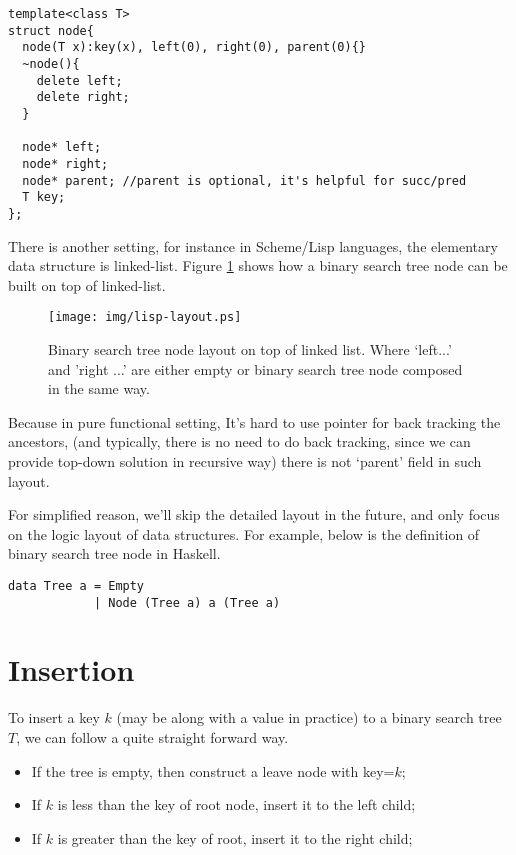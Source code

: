 \documentclass{article}
\begin{document}
\lstset{language=C++}
\begin{lstlisting}
template<class T>
struct node{
  node(T x):key(x), left(0), right(0), parent(0){}
  ~node(){ 
    delete left;
    delete right;
  }

  node* left; 
  node* right;
  node* parent; //parent is optional, it's helpful for succ/pred
  T key;
};
\end{lstlisting}

There is another setting, for instance in Scheme/Lisp languages, the elementary
data structure is linked-list. Figure \ref{fig:lisp-layout} shows how a binary
search tree node can be built on top of linked-list.

\begin{figure}[htbp]
       \begin{center}
        \texttt{[image: img/lisp-layout.ps]}
        \caption{Binary search tree node layout on top of linked list. Where `left...' and 'right ...' are either empty or binary search tree node composed in the same way.} \label{fig:lisp-layout}
       \end{center}
\end{figure}

Because in pure functional setting, It's hard to use pointer for back tracking
the ancestors, (and typically, there is no need to do back tracking, since
we can provide top-down solution in recursive way) there is not `parent' field
in such layout.

For simplified reason, we'll skip the detailed layout in the future, and only 
focus on the logic layout of data structures. For example, below is the definition
of binary search tree node in Haskell.

\lstset{language=Haskell}
\begin{lstlisting}
data Tree a = Empty 
            | Node (Tree a) a (Tree a)
\end{lstlisting}

\section{Insertion}

To insert a key $k$ (may be along with a value in practice) to a binary search tree $T$, we can follow a quite straight forward way.

\begin{itemize}
\item If the tree is empty, then construct a leave node with key=$k$;
\item If $k$ is less than the key of root node, insert it to the left child;
\item If $k$ is greater than the key of root, insert it to the right child;
\end{itemize}
\end{document}
